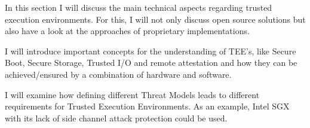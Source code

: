 In this section I will discuss the main technical aspects regarding trusted execution environments. For this, I will not only discuss open source solutions but also have a look at the approaches of proprietary implementations.

I will introduce important concepts for the understanding of TEE's, like Secure Boot, Secure Storage, Trusted I/O and remote attestation and how they can be achieved/ensured by a combination of hardware and software.

I will examine how defining different Threat Models leads to different requirements for Trusted Execution Environments. As an example, Intel SGX with its lack of side channel attack protection could be used.
